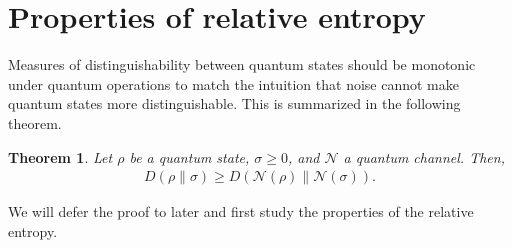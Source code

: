 \documentclass[notoc]{tufte-book}
\newtheorem{theorem}{Theorem}
\begin{document}
\section{Properties of relative entropy}
Measures of distinguishability between quantum states should be monotonic under quantum operations to match the intuition that noise cannot make quantum states more distinguishable. This is summarized in the following theorem.

\begin{tcolorbox}[colframe=white,breakable, colback=black!5, arc=0pt, outer arc=0pt]
\begin{theorem}\label{thm:data-processing-relative-entropy}
Let $\rho$ be a quantum state, $\sigma \geq 0$, and $\mathcal{N}$ a quantum channel. Then,
\begin{align}
    D(\rho \| \sigma) \geq D(\mathcal{N}(\rho) \| \mathcal{N}(\sigma)).
\end{align}
\end{theorem}
\end{tcolorbox}
We will defer the proof to later and first study the properties of the relative entropy.
\end{document}
